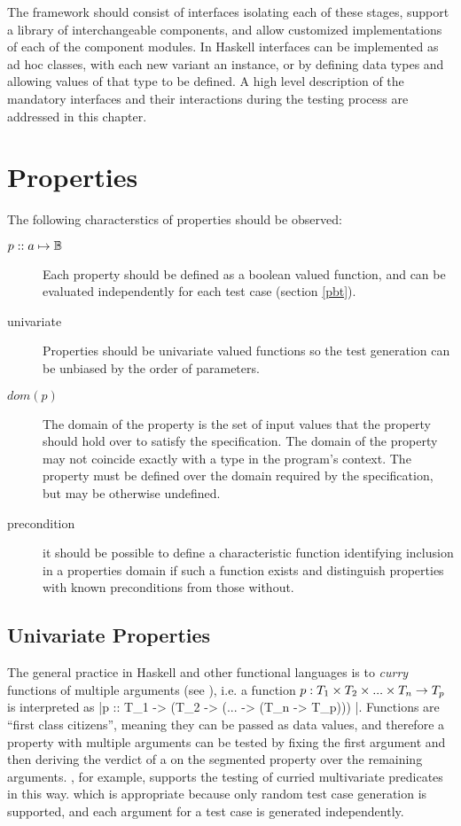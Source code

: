 The framework should consist of interfaces isolating each of these stages,
support a library of interchangeable components,
and allow customized implementations of each of the component modules.
In Haskell interfaces can be implemented as ad hoc classes,
with each new variant an instance, 
or by defining data types and allowing values of that type to be defined.
A high level description of the mandatory interfaces and 
their interactions during the testing process are addressed in this chapter.

\section {Properties}
The following characterstics of properties should be observed:

\begin{description}
\item[$p :: a \mapsto \mathbb{B}$] 
Each property should be defined as a boolean valued function,
and can be evaluated independently for each test case (section \ref{pbt}).
\item[univariate] Properties should be univariate valued functions
so the test generation can be unbiased by the order of parameters.
\item[$dom(p)$] The domain of the property is the set of input values
that the property should hold over to satisfy the specification.
The domain of the property may not coincide exactly with a type in the program's context.
The property must be defined over the domain required by the specification, but may be otherwise undefined.
\item[precondition] it should be possible to define a characteristic function identifying inclusion in a properties domain
if such a function exists and distinguish properties with known preconditions from those without.
\end{description}

\subsection{Univariate Properties}
The general practice in Haskell and other functional languages
is to \emph{curry} functions of multiple arguments (see \cite{Haskell2010Report}),
i.e. a function $p: T_1 \times T_2 \times ... \times T_n \rightarrow T_p$ is
interpreted as |p :: T_1 -> (T_2 -> (... -> (T_n -> T_p))) |.
Functions are ``first class citizens'',
meaning they can be passed as data values,
and therefore a property with multiple arguments
can be tested by fixing the first argument and 
then deriving the verdict of a \pbt on 
the segmented property over the remaining arguments.
\QC, for example, supports the testing of curried multivariate predicates in this way.
which is appropriate because only random test case generation is supported,
and each argument for a test case is generated independently.

